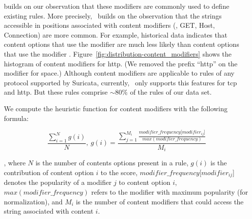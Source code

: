\documentclass[sigconf,review, anonymous]{acmart}
\begin{document}

\tname{} builds on our observation that these modifiers are commonly
used to define existing rules. More precisely, \tname\ builds on the
observation that the strings accessible in positions associated with
content modifiers (\eg{}, GET, Host, Connection) are more common. For
example, historical data indicates that content options that use the
modifier  are much less likely than content
options that use the modifier
. Figure~\ref{fig:distribution-content_modifiers}
shows the histogram of content modifiers for http. (We removed the
prefix ``http'' on the modifier for space.) Although content modifiers
are applicable to rules of any protocol supported by Suricata,
currently, \tname\ only supports this features for tcp and http. But
these rules comprise $\sim$80\% of the rules of our data set.



We compute the heuristic function for content modifiers with the
following formula:

\[\frac{\sum_{i=1}^{N}g(i)}{N},~g(i)=\frac{\sum_{j=1}^{M_i}\frac{\mathit{modifier\_frequency[modifier_{ij}}]}{\mathit{max(modifier\_frequency)}}}{M_i}\]

\noindent
, where $N$ is the number of contents options present in a rule,
$g(i)$ is the contribution of content option $i$ to the score,
$\mathit{modifier\_frequency[modifier_{ij}}]$ denotes the popularity
of a modifier $j$ to content option $i$,
$\mathit{max(modifier\_frequency)}$ refers to the modifier with
maximum popularity (for normalization), and $M_i$ is the number of
content modifiers that could access the string associated with content
$i$.


                                                                             
\end{document}
